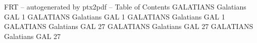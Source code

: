 \id FRT -- autogenerated by ptx2pdf --
\is Table of Contents
\tr {} GALATIANS Galatians GAL 1
\tr {} GALATIANS Galatians GAL 1
\tr {} GALATIANS Galatians GAL 1
\tr {} GALATIANS Galatians GAL 27
\tr {} GALATIANS Galatians GAL 27
\tr {} GALATIANS Galatians GAL 27
